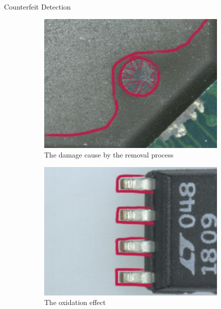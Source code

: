 \begin{section}{Counterfeit Detection}
  \begin{figure}[H]
    \centering
    \begin{subfigure}{0.4\textwidth}
      \centering
      \includegraphics[width=\textwidth]{img/hardware/texture variation.png}
      \caption{The damage cause by the removal process}
      \label{fig:texture-variations}
    \end{subfigure}
    \begin{subfigure}{0.4\textwidth}
      \centering
      \includegraphics[width=\textwidth]{img/hardware/oxidation effect.png}
      \caption{The oxidation effect}
      \label{fig:oxidation-effect}
    \end{subfigure}
    \begin{subfigure}{0.4\textwidth}

\end{subfigure}
\end{figure}
\end{section}
